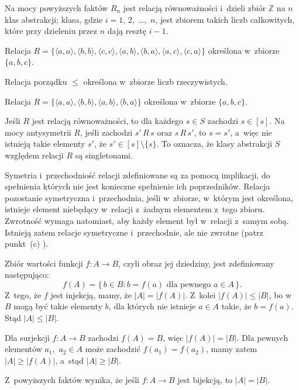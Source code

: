 Na mocy powyższych faktów $R_n$ jest relacją równoważności i~dzieli zbiór $\mathbb{Z}$ na $n$ klas abstrakcji;  klasa, gdzie $i=1$, 2,~\dots,~$n$, jest zbiorem takich liczb całkowitych, które przy dzieleniu przez $n$ dają resztę $i-1$.

\exercise %
\subexercise
Relacja $R=\bigl\{\langle a,a\rangle,\langle b,b\rangle,\langle c,c\rangle,\langle a,b\rangle,\langle b,a\rangle,\langle a,c\rangle,\langle c,a\rangle\bigr\}$ określona w~zbiorze $\{a,b,c\}$.

\subexercise
Relacja porządku $\le$ określona w~zbiorze liczb rzeczywistych.

\subexercise
Relacja $R=\bigl\{\langle a,a\rangle,\langle b,b\rangle,\langle a,b\rangle,\langle b,a\rangle\bigr\}$ określona w~zbiorze $\{a,b,c\}$.

\exercise %
Jeśli $R$ jest relacją równoważności, to dla każdego $s\in S$ zachodzi $s\in[s]$.
Na mocy antysymetrii $R$, jeśli zachodzi $s'\,R\,s$ oraz $s\,R\,s'$, to $s=s'$, a~więc nie istnieją takie elementy $s'$, że $s'\in[s]\setminus\{s\}$.
To oznacza, że klasy abstrakcji $S$ względem relacji $R$ są singletonami.

\exercise %
Symetria i~przechodniość relacji zdefiniowane są za pomocą implikacji, do spełnienia których nie jest konieczne spełnienie ich poprzedników.
Relacja pozostanie symetryczna i~przechodnia, jeśli w~zbiorze, w~którym jest określona, istnieje element niebędący w~relacji z~żadnym elementem z~tego zbioru.
Zwrotność wymaga natomiast, aby każdy element był w~relacji z~samym sobą.
Istnieją zatem relacje symetryczne i~przechodnie, ale nie zwrotne (patrz punkt~(c) ).


\exercise %
\subexercise
Zbiór wartości funkcji $f\colon A\to B$, czyli obraz jej dziedziny, jest zdefiniowany następująco:
\[
	f(A) = \bigl\{\,b\in B:b=f(a)\text{ dla pewnego $a\in A$}\,\bigr\}.
\]
Z~tego, że $f$ jest injekcją, mamy, że $|A|=|f(A)|$.
Z~kolei $|f(A)|\le|B|$, bo w~$B$ mogą być takie elementy $b$, dla których nie istnieje $a\in A$ takie, że $b=f(a)$.
Stąd $|A|\le|B|$.

\subexercise
Dla surjekcji $f\colon A\to B$ zachodzi $f(A)=B$, więc $|f(A)|=|B|$.
Dla pewnych elementów $a_1$,~$a_2\in A$ może zachodzić $f(a_1)=f(a_2)$, mamy zatem $|A|\ge|f(A)|$, a~stąd $|A|\ge|B|$.

\bigskip
\noindent Z~powyższych faktów wynika, że jeśli $f\colon A\to B$ jest bijekcją, to $|A|=|B|$.

